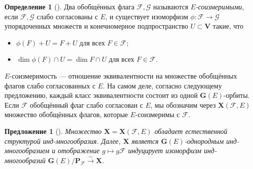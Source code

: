 \documentclass{amsart}
\newtheorem{proposition}{Предложение}
\theoremstyle{definition}
\newtheorem{definition}{Определение}
\newcommand{\NN}{\mathbb{N}^*}
\begin{document}
\begin{definition}[\cite{Dimitrov-Penkov}]
Два обобщённых флага $\mathcal{F},\mathcal{G}$ называются {\em $E$-соизмеримыми},
если $\mathcal{F},\mathcal{G}$ слабо согласованы с $E$, и существует изоморфизм $\phi:\mathcal{F}\to\mathcal{G}$ упорядоченных множеств и конечномерное подпространство $U\subset\mathbf{V}$ такие, что
\begin{itemize}
\item[\rm (i)] $\phi(F)+U=F+U$ для всех $F\in\mathcal{F}$;
\item[\rm (ii)] $\dim \phi(F)\cap U=\dim F\cap U$ для всех $F\in\mathcal{F}$.
\end{itemize}
\end{definition}

$E$-соизмеримость --- отношение эквивалентности на множестве обобщённых флагов слабо согласованных с  $E$. На самом деле, согласно следующему предложению, каждый класс эквивалентности состоит из одной $\mathbf{G}(E)$-орбиты.
Если $\mathcal{F}$ обобщённый флаг слабо согласован с  $E$, мы обозначим через $\mathbf{X}(\mathcal{F},E)$ множество обобщённых флагов, которые $E$-соизмеримы с  $\mathcal{F}$.

\begin{proposition}[\cite{Dimitrov-Penkov}]
\label{P2.3-1}
Множество $\mathbf{X}=\mathbf{X}(\mathcal{F},E)$ обладает естественной структурой инд-многообразия.
Далее, $\mathbf{X}$  является $\mathbf{G}(E)$-однородным инд-многообразием и отображение $g\mapsto g\mathcal{F}$ индуцирует изоморфизм инд-многооб\-разий $\mathbf{G}(E)/\mathbf{P}_\mathcal{F}\stackrel{\sim}{\to}\mathbf{X}$.
\end{proposition}

\end{document}
